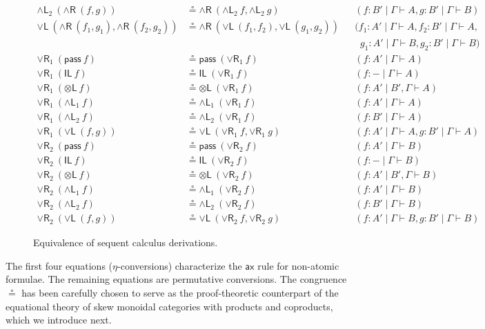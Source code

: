 \documentclass[submission,copyright,creativecommons]{eptcs}
\theoremstyle{definition}
\newcommand{\tl}{\otimes \mathsf{L}}
\newcommand{\pass}{\mathsf{pass}}
\newcommand{\unitl}{\mathsf{IL}}
\newcommand{\andlone}{\land \mathsf{L}_{1}}
\newcommand{\andltwo}{\land \mathsf{L}_{2}}
\newcommand{\andr}{\land \mathsf{R}}
\newcommand{\orl}{\lor \mathsf{L}}
\newcommand{\orrone}{\lor \mathsf{R}_{1}}
\newcommand{\orrtwo}{\lor \mathsf{R}_{2}}
\newcommand{\ax}{\mathsf{ax}}
\newcommand{\ot}{\otimes}
\newcommand{\lolli}{\multimap}
\newcommand{\I}{\mathsf{I}}
\begin{document}
\begin{figure}[t]
\begin{equation}
\begin{array}{rlll}
    \\
    \andltwo \ (\andr \ (f , g)) &\circeq \andr \ (\andltwo \ f , \andltwo \ g)&&(f : B' \mid \Gamma \vdash A , g : B' \mid \Gamma \vdash B)
    \\
    \orl \ (\andr \ (f_1 , g_1) , \andr \ (f_2 , g_2)) &\circeq  \andr \ (\orl \ (f_1 , f_2) , \orl \ (g_1 , g_2)) &&(f_1 : A' \mid \Gamma \vdash A , f_2 : B' \mid \Gamma \vdash A , 
    \\
    & &&\;\;g_1 : A' \mid \Gamma \vdash B , g_2 : B' \mid \Gamma \vdash B)
    \\
    \orrone \ (\pass \ f) &\circeq \pass \ (\orrone \ f) &&(f : A' \mid \Gamma \vdash A)
    \\
    \orrone \ (\unitl \ f) &\circeq \unitl \ (\orrone \ f) &&(f : - \mid \Gamma \vdash A)
    \\
    \orrone \ (\tl \ f) &\circeq \tl \ (\orrone \ f) &&(f : A' \mid B' , \Gamma \vdash A)
    \\
    \orrone \ (\andlone \ f) &\circeq \andlone \ (\orrone \ f) &&(f : A' \mid \Gamma \vdash A)
    \\
    \orrone \ (\andltwo \ f) &\circeq \andltwo \ (\orrone \ f) &&(f : B' \mid \Gamma \vdash A)
    \\
    \orrone \ (\orl \ (f , g)) &\circeq \orl \ (\orrone \ f , \orrone \ g) &&(f : A' \mid \Gamma \vdash A , g : B' \mid \Gamma \vdash A)
    \\
    \orrtwo \ (\pass \ f) &\circeq \pass \ (\orrtwo \ f) &&(f : A' \mid \Gamma \vdash B)
    \\
    \orrtwo \ (\unitl \ f) &\circeq \unitl \ (\orrtwo \ f) &&(f : - \mid \Gamma \vdash B)
    \\
    \orrtwo \ (\tl \ f) &\circeq \tl \ (\orrtwo \ f) &&(f : A' \mid B' , \Gamma \vdash B)
    \\
    \orrtwo \ (\andlone \ f) &\circeq \andlone \ (\orrtwo \ f) &&(f : A' \mid \Gamma \vdash B)
    \\
    \orrtwo \ (\andltwo \ f) &\circeq \andltwo \ (\orrtwo \ f) &&(f : B' \mid \Gamma \vdash B)
    \\
    \orrtwo \ (\orl \ (f , g)) &\circeq \orl \ (\orrtwo \ f , \orrtwo \ g) &&(f : A' \mid \Gamma \vdash B , g : B' \mid \Gamma \vdash B)
  \end{array}
  \end{equation}
  \caption{Equivalence of sequent calculus derivations.}
\end{figure}
The first four equations ($\eta$-conversions) characterize the $\ax$ rule for non-atomic formulae. The remaining equations are permutative conversions. The congruence $\circeq$ has been carefully chosen to serve as the proof-theoretic counterpart of the equational theory of skew monoidal categories with products and coproducts, which we introduce next.
\end{document}
